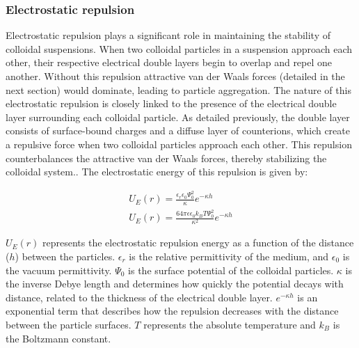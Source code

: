 

\subsubsection{Electrostatic repulsion}


Electrostatic repulsion plays a significant role in maintaining the stability of colloidal suspensions. When two colloidal particles in a suspension approach each other, their respective electrical double layers begin to overlap and repel one another. Without this repulsion attractive van der Waals forces (detailed in the next section) would dominate, leading to particle aggregation. The nature of this electrostatic repulsion is closely linked to the presence of the electrical double layer surrounding each colloidal particle. As detailed previously, the double layer consists of surface-bound charges and a diffuse layer of counterions, which create a repulsive force when two colloidal particles approach each other. This repulsion counterbalances the attractive van der Waals forces, thereby  stabilizing the colloidal system..\cite{?} The electrostatic energy of this repulsion is given by:


\begin{equation} %
\begin{split}
U_E(r) = \frac{\epsilon_r \epsilon_0 \Psi_0^2}{\kappa} e^{-\kappa h} \\
U_E(r)= \frac{64 \pi \epsilon \epsilon_0 k_BT \Psi_0^2}{\kappa^2} e^{-\kappa h}
\end{split}
\end{equation}

\( U_E(r) \) represents the electrostatic repulsion energy as a function of the distance (\( h \)) between the particles. \( \epsilon_r \) is the relative permittivity of the medium, and \( \epsilon_0 \) is the vacuum permittivity. \( \Psi_0 \) is the surface potential of the colloidal particles. \( \kappa \) is the inverse Debye length and determines how quickly the potential decays with distance, related to the thickness of the electrical double layer. \( e^{-\kappa h} \) is an exponential term that describes how the repulsion decreases with the distance between the particle surfaces. $T$ represents the absolute temperature and $k_B$ is the Boltzmann constant. \cite{OHSHIMA200218} \cite{behrens2001charge}

